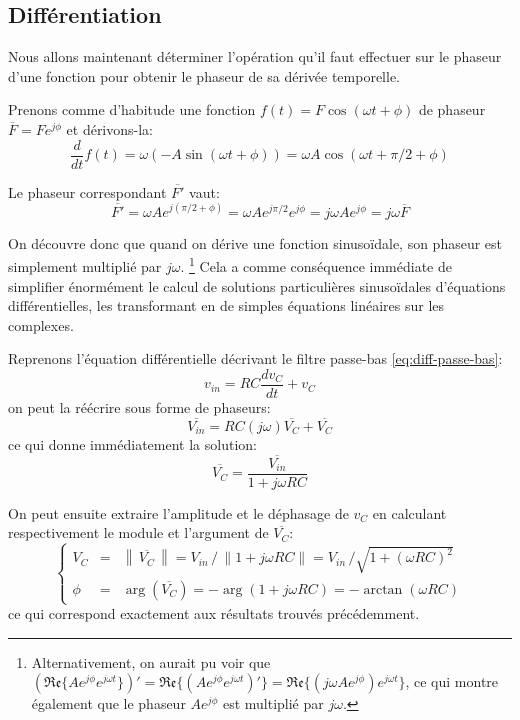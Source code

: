 \subsection{Différentiation}

Nous allons maintenant déterminer l'opération qu'il faut effectuer
sur le phaseur d'une fonction pour obtenir le phaseur de sa dérivée temporelle.

Prenons comme d'habitude une fonction $f(t) = F\cos(\omega t + \phi)$
de phaseur $\overline{F} = Fe^{j\phi}$
et dérivons-la:
\begin{equation}
    \frac{d}{dt}f(t) = \omega (-A\sin(\omega t + \phi))
    = \omega A \cos(\omega t + \pi/2 + \phi)
\end{equation}

Le phaseur correspondant $\overline{F'}$ vaut:
\begin{equation}
    \overline{F'} = \omega A e^{j(\pi/2 + \phi)} = \omega A e^{j\pi/2} e^{j\phi}
    = j\omega A e^{j\phi} = j\omega \overline{F}
\end{equation}

On découvre donc que quand on dérive une fonction sinusoïdale,
son phaseur est simplement multiplié par $j\omega$.
\footnote{
    Alternativement, on aurait pu voir que
    $(\mathfrak{Re}\{Ae^{j\phi}e^{j\omega t}\})'
    = \mathfrak{Re}\{(Ae^{j\phi}e^{j\omega t})'\}
    = \mathfrak{Re}\{(j\omega A e^{j\phi}) e^{j\omega t}\}$,
    ce qui montre également que le phaseur $Ae^{j\phi}$
    est multiplié par $j\omega$.
}
Cela a comme conséquence immédiate de simplifier énormément
le calcul de solutions particulières sinusoïdales d'équations différentielles,
les transformant en de simples équations linéaires sur les complexes.

Reprenons l'équation différentielle décrivant le filtre passe-bas
\eqref{eq:diff-passe-bas}:
\[
    v_{in} = RC\frac{dv_C}{dt} + v_C
\]
on peut la réécrire sous forme de phaseurs:
\begin{equation}
    \overline{V_{in}} = RC(j\omega)\overline{V_C} + \overline{V_C}
\end{equation}
ce qui donne immédiatement la solution:
\begin{equation}
    \overline{V_C} = \frac{\overline{V_{in}}}{1 + j\omega RC}
\end{equation}

On peut ensuite extraire l'amplitude et le déphasage de $v_C$
en calculant respectivement le module et l'argument de $\overline{V_C}$:
\begin{equation}
    \left\{
        \begin{array}{ccl}
            V_C &=& \left\|\,\overline{V_C}\,\right\|
            = V_{in}\,/\,\|1+j\omega RC\|
            = V_{in}\,/\sqrt{1 + (\omega RC)^2} \\
            \phi &=& \arg\left(\overline{V_C}\right) = -\arg(1+j\omega RC)
            = - \arctan(\omega RC)
        \end{array}
    \right.
\end{equation}
ce qui correspond exactement aux résultats trouvés précédemment.
